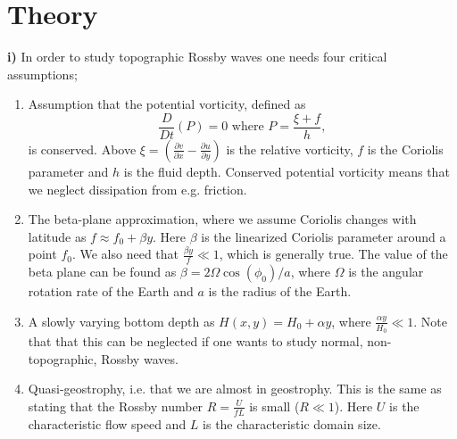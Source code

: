 \section{Theory}
\textbf{i)} In order to study topographic Rossby waves one needs four critical assumptions; 
\begin{enumerate}
    \item Assumption that the potential vorticity, defined as 
    \begin{equation}
        \frac{D}{Dt}\left(P\right)=0 \text{ where } P=\frac{\xi+f}{h},
    \end{equation}
    is conserved. Above $\xi=\left(\tfrac{\partial v}{\partial x}-\tfrac{\partial u}{\partial y}\right)$ is the relative vorticity, $f$ is the Coriolis parameter and $h$ is the fluid depth. Conserved potential vorticity means that we neglect dissipation from e.g. friction. 
    \item The beta-plane approximation, where we assume Coriolis changes with latitude as $f\approx f_0+\beta y$. Here $\beta$ is the linearized Coriolis parameter around a point $f_0$. We also need that $\tfrac{\beta y}{f}\ll1$, which is generally true.  The value of the beta plane can be found as $\beta=2\Omega\cos(\phi_0)/a$, where $\Omega$ is the angular rotation rate of the Earth and $a$ is the radius of the Earth.
    \item A slowly varying bottom depth as $H(x,y)=H_0+\alpha y$, where $\tfrac{\alpha y}{H_0}\ll1$. Note that that this can be neglected if one wants to study normal, non-topographic, Rossby waves.
    \item Quasi-geostrophy, i.e. that we are almost in geostrophy. This is the same as stating that the Rossby number $R=\tfrac{U}{fL}$ is small ($R\ll1$). Here $U$ is the characteristic flow speed and $L$ is the characteristic domain size. 
\end{enumerate}

